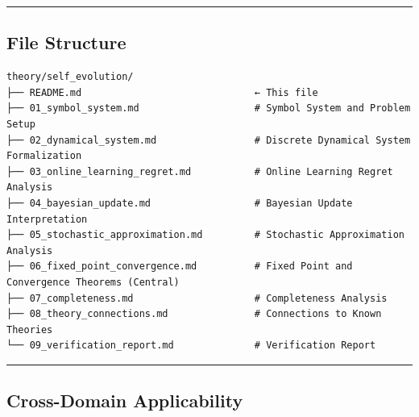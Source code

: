 \documentclass[
  12pt,
]{article}
\begin{document}
\begin{center}\rule{0.5\linewidth}{0.5pt}\end{center}

\subsection{File Structure}\label{file-structure}

\begin{verbatim}
theory/self_evolution/
├── README.md                              ← This file
├── 01_symbol_system.md                    # Symbol System and Problem Setup
├── 02_dynamical_system.md                 # Discrete Dynamical System Formalization
├── 03_online_learning_regret.md           # Online Learning Regret Analysis
├── 04_bayesian_update.md                  # Bayesian Update Interpretation
├── 05_stochastic_approximation.md         # Stochastic Approximation Analysis
├── 06_fixed_point_convergence.md          # Fixed Point and Convergence Theorems (Central)
├── 07_completeness.md                     # Completeness Analysis
├── 08_theory_connections.md               # Connections to Known Theories
└── 09_verification_report.md              # Verification Report
\end{verbatim}

\begin{center}\rule{0.5\linewidth}{0.5pt}\end{center}

\subsection{Cross-Domain Applicability}\label{cross-domain}
\end{document}
